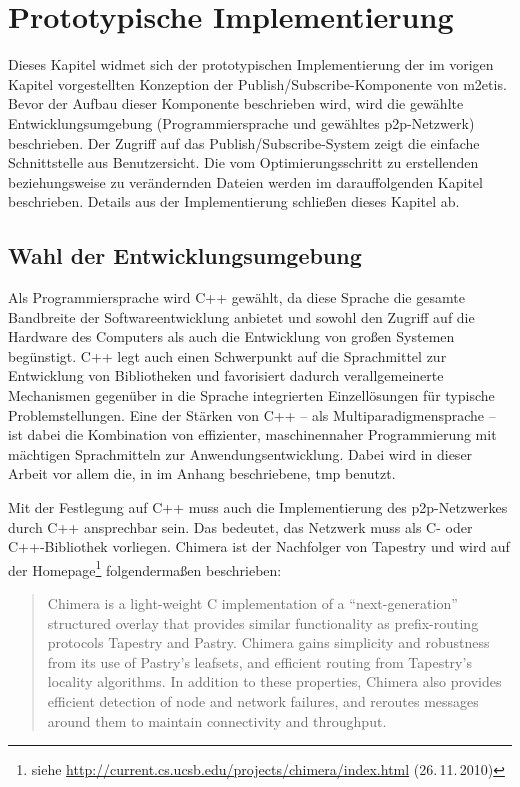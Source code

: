 \chapter{Prototypische Implementierung}
\label{chap:impl}
Dieses Kapitel widmet sich der prototypischen Implementierung der im vorigen Kapitel vorgestellten Konzeption der Publish/Subscribe-Komponente von \ac{m2etis}. Bevor der Aufbau dieser Komponente beschrieben wird, wird die gewählte Entwicklungsumgebung (Programmiersprache und gewähltes \ac{p2p}-Netzwerk) beschrieben. Der Zugriff auf das Publish/Subscribe-System zeigt die einfache Schnittstelle aus Benutzersicht. Die vom Optimierungsschritt zu erstellenden beziehungsweise zu verändernden Dateien werden im darauffolgenden Kapitel beschrieben. Details aus der Implementierung schließen dieses Kapitel ab.

\section{Wahl der Entwicklungsumgebung}
Als Programmiersprache wird C++ gewählt, da diese Sprache die gesamte Bandbreite der Softwareentwicklung anbietet und sowohl den Zugriff auf die Hardware des Computers als auch die Entwicklung von großen Systemen begünstigt. C++ legt auch einen Schwerpunkt auf die Sprachmittel zur Entwicklung von Bibliotheken und favorisiert dadurch verallgemeinerte Mechanismen gegenüber in die Sprache integrierten Einzellösungen für typische Problemstellungen. Eine der Stärken von C++ -- als Multiparadigmensprache -- ist dabei die Kombination von effizienter, maschinennaher Programmierung mit mächtigen Sprachmitteln zur Anwendungsentwicklung. Dabei wird in dieser Arbeit vor allem die, in  im Anhang beschriebene, \acf{tmp} benutzt.

Mit der Festlegung auf C++ muss auch die Implementierung des p2p-Netzwerkes durch C++ ansprechbar sein. Das bedeutet, das Netzwerk muss als C- oder C++-Bibliothek vorliegen. Chimera \cite{Allen2006Chimera} ist der Nachfolger von Tapestry und wird auf der Homepage\footnote{siehe \url{http://current.cs.ucsb.edu/projects/chimera/index.html} (26.\,11.\,2010)} folgendermaßen beschrieben: 
\begin{quote}
Chimera is a light-weight C implementation of a \enquote{next-generation} structured overlay that provides similar functionality as prefix-routing protocols Tapestry and Pastry.  Chimera gains simplicity and robustness from its use of Pastry's leafsets, and efficient routing from Tapestry's locality algorithms.  In addition to these properties, Chimera also provides efficient detection of node and network failures, and reroutes messages around them to maintain connectivity and throughput.  
\end{quote}

